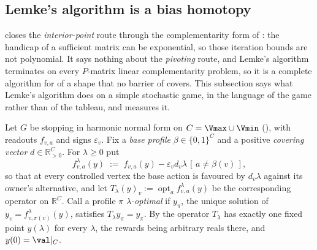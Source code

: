 
\subsection{Lemke's algorithm is a bias homotopy}\label{sec:fsa-lemke}

 closes the \emph{interior-point} route through the
complementarity form of : the handicap of a sufficient matrix
can be exponential, so those iteration bounds are not polynomial. It says
nothing about the \emph{pivoting} route, and Lemke's algorithm terminates on
every $P$-matrix linear complementarity problem, so it is a complete
algorithm for  of a shape that no barrier of 
covers. This subsection says what Lemke's algorithm does on a simple
stochastic game, in the language of the game rather than of the tableau, and
measures it.

\begin{definition}\label{fsa:def-bias}
Let $G$ be stopping in harmonic normal form on $C=\Vmax\cup\Vmin$
(), with readouts $f_{v,a}$ and signs
$\varepsilon_v$. Fix a \emph{base profile} $\beta\in\{0,1\}^{C}$ and a
positive \emph{covering vector} $d\in\mathbb R^{C}_{>0}$. For $\lambda\ge0$
put
\[
  f^{\lambda}_{v,a}(y)\;:=\;f_{v,a}(y)-\varepsilon_v d_v\lambda\,
     [\,a\ne\beta(v)\,],
\]
so that at every controlled vertex the base action is favoured by $d_v\lambda$
against its owner's alternative, and let
$T_\lambda(y)_v:=\operatorname{opt}_a f^{\lambda}_{v,a}(y)$ be the
corresponding operator on $\mathbb R^{C}$. Call a profile $\pi$
\emph{$\lambda$-optimal} if $y_\pi$, the unique solution of
$y_v=f^{\lambda}_{v,\pi(v)}(y)$, satisfies $T_\lambda y_\pi=y_\pi$.
By  the operator $T_\lambda$ has exactly one
fixed point $y(\lambda)$ for every $\lambda$, the rewards being arbitrary
reals there, and $y(0)=\val|_C$.
\end{definition}

